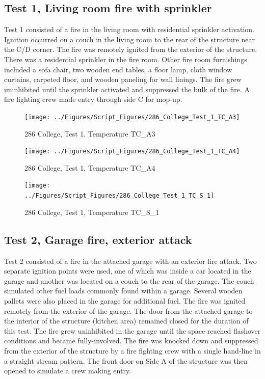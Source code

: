 \documentclass[12pt,oneside]{book}
\begin{document}
\subsection{Test 1, Living room fire with sprinkler}

Test 1 consisted of a fire in the living room with residential sprinkler activation.  Ignition occurred on a couch in the living room to the rear of the structure near the C/D corner.  The fire was remotely ignited from the exterior of the structure.  There was a residential sprinkler in the fire room.  Other fire room furnishings included a sofa chair, two wooden end tables, a floor lamp, cloth window curtains, carpeted floor, and wooden paneling for wall linings.  The fire grew uninhibited until the sprinkler activated and suppressed the bulk of the fire.  A fire fighting crew made entry through side C for mop-up.

\begin{figure}[!ht]
\texttt{[image: ../Figures/Script\_Figures/286\_College\_Test\_1\_TC\_A3]}
\caption{286 College, Test 1, Temperature TC\_A3}
\label{fig:286_College_Test_1_TC_A3}
\end{figure}

\begin{figure}[!ht]
\texttt{[image: ../Figures/Script\_Figures/286\_College\_Test\_1\_TC\_A4]}
\caption{286 College, Test 1, Temperature TC\_A4}
\label{fig:286_College_Test_1_TC_A4}
\end{figure}

\begin{figure}[!ht]
\texttt{[image: ../Figures/Script\_Figures/286\_College\_Test\_1\_TC\_S\_1]}
\caption{286 College, Test 1, Temperature TC\_S\_1}
\label{fig:286_College_Test_1_TC_S_1}
\end{figure}


\clearpage


\subsection{Test 2, Garage fire, exterior attack}

Test 2 consisted of a fire in the attached garage with an exterior fire attack.  Two separate ignition points were used, one of which was inside a car located in the garage and another was located on a couch to the rear of the garage.  The couch simulated other fuel loads commonly found within a garage.  Several wooden pallets were also placed in the garage for additional fuel.  The fire was ignited remotely from the exterior of the garage.  The door from the attached garage to the interior of the structure (kitchen area) remained closed for the duration of this test.  The fire grew uninhibited in the garage until the space reached flashover conditions and became fully-involved.  The fire was knocked down and suppressed from the exterior of the structure by a fire fighting crew with a single hand-line in a straight stream pattern.  The front door on Side A of the structure was then opened to simulate a crew making entry.   
\end{document}
